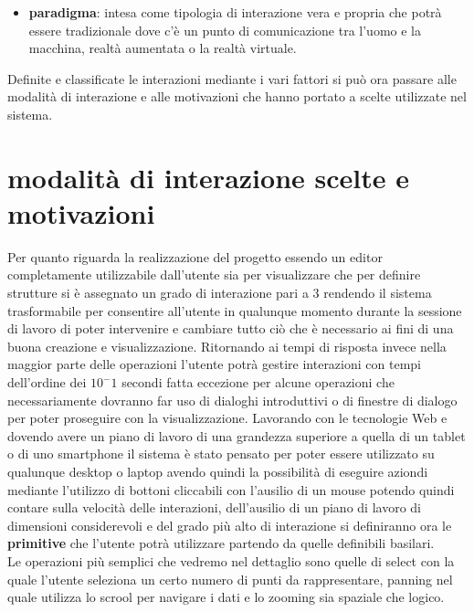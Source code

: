 {\begin{itemize}
\begin{enumerate}
		\item \textbf{manipolabile} ovvero di grado $2$ in cui è possibile cambiare la vista della scena e quindi evidenziare ed analizzare meglio un dato dalla sua rappresentazione non potendo però modificare i dati da cui è nata la visualizzazione;
		\item \textbf{trasformabile} ovvero di grado $3$ dove l’interazione permette di intervenire nella fase di processo e cambiare il dato di input.
	\end{enumerate}
	\item \textbf{paradigma}: intesa come tipologia di interazione vera e propria che potrà essere tradizionale dove c’è un punto di comunicazione tra l’uomo e la macchina, realtà aumentata o la realtà virtuale.
\end{itemize}
Definite e classificate le interazioni mediante i vari fattori si può ora passare alle modalità di interazione e alle motivazioni che hanno portato a scelte utilizzate nel sistema.
\section{modalità di interazione scelte e motivazioni}
Per quanto riguarda la realizzazione del progetto essendo un editor completamente utilizzabile dall'utente sia per visualizzare che per definire strutture si è assegnato un grado di interazione pari a $3$ rendendo il sistema trasformabile per consentire all'utente in qualunque momento durante la sessione di lavoro di poter intervenire e cambiare tutto ciò che è necessario ai fini di una buona creazione e visualizzazione.
Ritornando ai tempi di risposta invece nella maggior parte delle operazioni l'utente potrà gestire interazioni con tempi dell'ordine dei $10^-1$ secondi fatta eccezione per alcune operazioni che necessariamente dovranno far uso di dialoghi introduttivi o di finestre di dialogo per poter proseguire con la visualizzazione. Lavorando con le tecnologie Web e dovendo avere un piano di lavoro di una grandezza superiore a quella di un tablet o di uno smartphone il sistema è stato pensato per poter essere utilizzato su qualunque desktop o laptop avendo quindi la possibilità di eseguire aziondi mediante l'utilizzo di bottoni cliccabili con l'ausilio di un mouse potendo quindi contare sulla velocità delle interazioni, dell'ausilio di un piano di lavoro di dimensioni considerevoli e del grado più alto di interazione si definiranno ora le \textbf{primitive} che l'utente potrà utilizzare partendo da quelle definibili basilari.\\
Le operazioni più semplici che vedremo nel dettaglio sono quelle di select con la quale l’utente seleziona un certo numero di punti da rappresentare, panning nel quale utilizza lo scrool per navigare i dati e lo zooming sia spaziale che logico.

}
